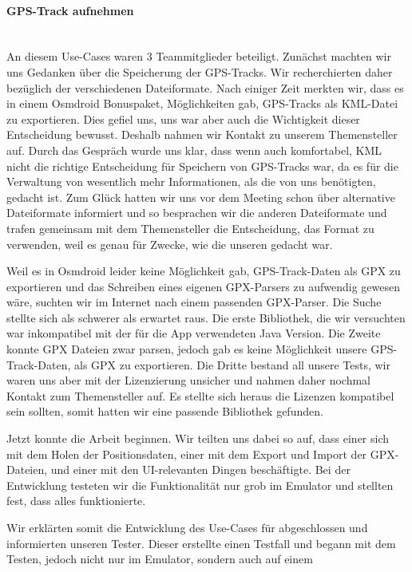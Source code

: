 \documentclass[10pt]{article}
\begin{document}
\paragraph{GPS-Track aufnehmen} \quad\\
An diesem Use-Cases waren 3 Teammitglieder beteiligt. Zunächst machten wir uns Gedanken über die Speicherung 
der GPS-Tracks. Wir recherchierten daher bezüglich der verschiedenen Dateiformate. Nach einiger Zeit merkten wir, 
dass es in einem Osmdroid Bonuspaket, Möglichkeiten gab, GPS-Tracks als KML-Datei zu exportieren. 
Dies gefiel uns, uns war aber auch die Wichtigkeit dieser Entscheidung bewusst. Deshalb nahmen wir Kontakt zu unserem 
Themensteller auf. Durch das Gespräch wurde uns klar, dass wenn auch komfortabel, KML nicht die richtige Entscheidung 
für Speichern von GPS-Tracks war, da es für die Verwaltung von wesentlich mehr Informationen, als die von uns benötigten,
gedacht ist. Zum Glück hatten wir uns vor dem Meeting schon über alternative Dateiformate informiert und so besprachen 
wir die anderen Dateiformate und trafen gemeinsam mit dem Themensteller die Entscheidung, das Format  zu verwenden,
weil es genau für Zwecke, wie die unseren gedacht war.\par 
\medskip
Weil es in Osmdroid leider keine Möglichkeit gab, GPS-Track-Daten als GPX zu exportieren und das Schreiben eines eigenen
GPX-Parsers zu aufwendig gewesen wäre, suchten wir im Internet nach einem passenden GPX-Parser. Die Suche 
stellte sich als schwerer als erwartet raus. Die erste Bibliothek, die wir versuchten war inkompatibel mit der 
für die App verwendeten Java Version. Die Zweite konnte GPX Dateien zwar parsen, jedoch gab es keine Möglichkeit unsere GPS-Track-Daten, als GPX zu exportieren. Die Dritte bestand all unsere Tests, wir waren uns aber mit der 
Lizenzierung unsicher und nahmen daher nochmal Kontakt zum Themensteller auf. Es stellte sich heraus die Lizenzen 
kompatibel sein sollten, somit hatten wir eine passende Bibliothek gefunden.\par 
\medskip 
Jetzt konnte die Arbeit beginnen. Wir teilten uns dabei so auf, dass einer sich mit dem Holen der Positionsdaten, 
einer mit dem Export und Import der GPX-Dateien, und einer mit den UI-relevanten Dingen beschäftigte. Bei der Entwicklung 
testeten wir die Funktionalität nur grob im Emulator und stellten fest, dass alles funktionierte.\par 
\medskip
Wir erklärten somit die Entwicklung des Use-Cases für abgeschlossen und informierten unseren Tester. 
Dieser erstellte einen Testfall und begann mit dem Testen, jedoch nicht nur im Emulator, sondern auch auf einem 
\end{document}
